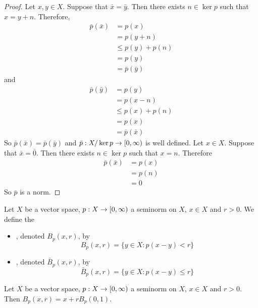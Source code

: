 \documentclass{book}
\begin{document}
	\begin{proof}
		Let $x, y \in X$. Suppose that $\bar{x} = \bar{y}$. Then there exists $n \in \ker p$ such that $x = y + n$. Therefore, 
		\begin{align*}
			\bar{p}(\bar{x}) 
			&= p(x) \\
			&= p(y + n) \\
			&\leq p(y) + p(n) \\
			&= p(y) \\
			&= \bar{p}(\bar{y})
		\end{align*}
		and 
		\begin{align*}
			\bar{p}(\bar{y}) 
			&= p(y) \\
			&= p(x - n) \\
			&\leq p(x) + p(n) \\
			&= p(x) \\
			&= \bar{p}(\bar{x})
		\end{align*}
		So $\bar{p}(\bar{x}) = \bar{p}(\bar{y})$ and $\bar{p}: X / \ker p \rightarrow [0,\infty)$ is well defined. Let $x \in X$. Suppose that $\bar{x} = \bar{0}$. Then there exists $n \in \ker p$ such that $x = n$. Therefore 
		\begin{align*}
			\bar{p}(\bar{x}) 
			&= p(x) \\
			&= p(n) \\
			&= 0
		\end{align*}
		So $\bar{p}$ is a norm.
	\end{proof}

	
	\begin{defn}
		Let $X$ be a vector space, $p:X \rightarrow [0,\infty)$ a seminorm on $X$, $x \in X$ and $r >0$. We define the 
		\begin{itemize}
			\item {}, denoted $B_p(x, r)$, by $$B_p(x, r) = \{y \in X: p(x - y) < r\}$$
			\item {}, denoted $\bar{B}_p(x, r)$, by $$\bar{B}_p(x, r) = \{y \in X: p(x - y) \leq r\}$$
		\end{itemize}
	\end{defn}

	\begin{ex} 
		Let $X$ be a vector space, $p:X \rightarrow [0,\infty)$ a seminorm on $X$, $x \in X$ and $r >0$. Then $B_p(x, r) =  x + rB_p(0, 1)$. 
	\end{ex}
\end{document}
